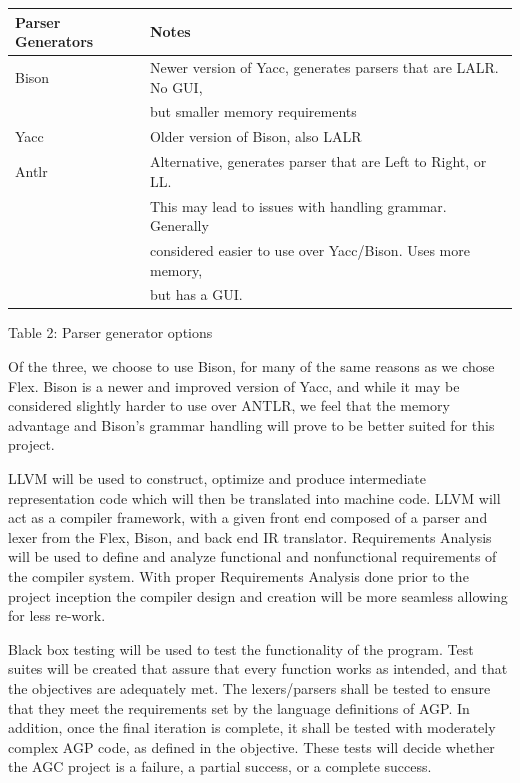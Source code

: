 \documentclass[11pt]{article}
\begin{document}
\begin{center}
\begin{tabular}{ |l | l|  }
 \hline
 Parser Generators & Notes \\
 \hline 
 Bison & Newer version of Yacc, generates parsers that are LALR. No GUI,\\
       & but smaller memory requirements \\
 \hline 
 Yacc & Older version of Bison, also LALR \\
 \hline
 Antlr & Alternative, generates parser that are Left to Right, or  LL.\\
       & This may lead to issues with handling grammar. Generally \\
       & considered easier to use over Yacc/Bison. Uses more memory,\\
       & but has a GUI. \\
 \hline
\end{tabular}
\end{center}

\begin{center}
Table 2: Parser generator options
\end{center}

Of the three, we choose to use Bison, for many of the same reasons as we chose Flex. Bison is a newer and improved version of Yacc, and while it may be considered slightly harder to use over ANTLR, we feel that the memory advantage and Bison’s grammar handling will prove to be better suited for this project.

 LLVM will be used to construct, optimize and produce intermediate representation code which will then be translated into machine code. LLVM will act as a compiler framework, with a given front end composed of a parser and lexer from the Flex, Bison, and back end IR translator. Requirements Analysis will be used to define and analyze functional and nonfunctional requirements of the compiler system. With proper Requirements Analysis done prior to the project inception the compiler design and creation will be more seamless allowing for less re-work. 

Black box testing will be used to test the functionality of the program. Test suites will be created that assure that every function works as intended, and that the objectives are adequately met. The lexers/parsers shall be tested to ensure that they meet the requirements set by the language definitions of AGP. In addition, once the final iteration is complete, it shall be tested with moderately complex AGP code, as defined in the objective. These tests will decide whether the AGC project is a failure, a partial success, or a complete success.
\end{document}
